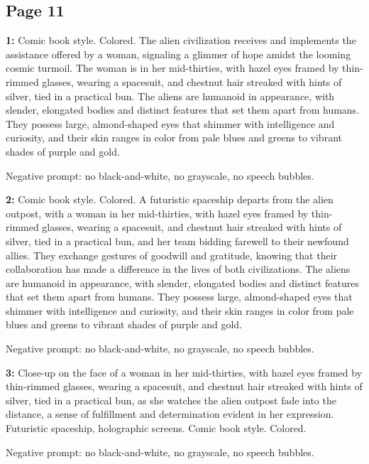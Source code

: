 \subsection*{Page 11}
\begin{iquote}
    \textbf{1:} Comic book style. Colored. The alien civilization receives and implements the assistance offered by a woman, signaling a glimmer of hope amidst the looming cosmic turmoil. The woman is in her mid-thirties, with hazel eyes framed by thin-rimmed glasses, wearing a spacesuit, and chestnut hair streaked with hints of silver, tied in a practical bun. The aliens are humanoid in appearance, with slender, elongated bodies and distinct features that set them apart from humans. They possess large, almond-shaped eyes that shimmer with intelligence and curiosity, and their skin ranges in color from pale blues and greens to vibrant shades of purple and gold.

    \noindent Negative prompt: no black-and-white, no grayscale, no speech bubbles.
\end{iquote}

\begin{iquote}
    \textbf{2:} Comic book style. Colored. A futuristic spaceship departs from the alien outpost, with a woman in her mid-thirties, with hazel eyes framed by thin-rimmed glasses, wearing a spacesuit, and chestnut hair streaked with hints of silver, tied in a practical bun, and her team bidding farewell to their newfound allies. They exchange gestures of goodwill and gratitude, knowing that their collaboration has made a difference in the lives of both civilizations. The aliens are humanoid in appearance, with slender, elongated bodies and distinct features that set them apart from humans. They possess large, almond-shaped eyes that shimmer with intelligence and curiosity, and their skin ranges in color from pale blues and greens to vibrant shades of purple and gold.

    \noindent Negative prompt: no black-and-white, no grayscale, no speech bubbles.
\end{iquote}

\begin{iquote}
    \textbf{3:} Close-up on the face of a woman in her mid-thirties, with hazel eyes framed by thin-rimmed glasses, wearing a spacesuit, and chestnut hair streaked with hints of silver, tied in a practical bun, as she watches the alien outpost fade into the distance, a sense of fulfillment and determination evident in her expression. Futuristic spaceship, holographic screens. Comic book style. Colored.

    \noindent Negative prompt: no black-and-white, no grayscale, no speech bubbles.
\end{iquote}

